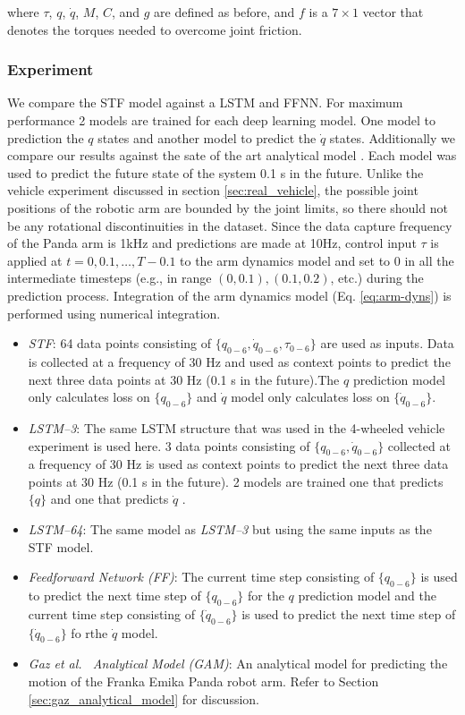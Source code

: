 \documentclass[letterpaper, 10 pt, conference]{ieeeconf}  %
\begin{document}
\noindent where $\tau$, $q$, $\dot{q}$, $M$, $C$, and $g$ are defined as before, and $f$ is a $7\times1$ vector that denotes the torques needed to overcome joint friction.

\subsubsection{Experiment}
We compare the STF model against a LSTM and FFNN. For maximum performance 2 models are trained for each deep learning model. One model to prediction the $q$ states and another model to predict the $\dot q$ states. Additionally we compare our results against the sate of the art analytical model \cite{gaz2019dynamic} . Each model was used to predict the future state of the system 0.1 s in the future. Unlike the vehicle experiment discussed in section \ref{sec:real_vehicle}, the possible joint positions of the robotic arm are bounded by the joint limits, so there should not be any rotational discontinuities in the dataset. Since the data capture frequency of the Panda arm is 1kHz and predictions are made at 10Hz, control input $\tau$ is applied at $t=0, 0.1, \ldots, T-0.1$ to the arm dynamics model and set to $0$ in all the intermediate timesteps (e.g., in range $(0, 0.1), (0.1, 0.2)$, etc.) during the prediction process. Integration of the arm dynamics model (Eq. \ref{eq:arm-dyns}) is performed using numerical integration. 
\begin{itemize}
    \item \emph{STF}: 64 data points consisting of $\{q_{0-6}, \dot q_{0-6}, \tau_{0-6}\}$ are used as inputs.  Data is collected at a frequency of 30 Hz and used as context points to predict the next three data points at 30 Hz (0.1 s in the future).The $q$ prediction model only calculates loss on $\{q_{0-6}\}$ and  $\dot q$ model only calculates loss on $\{\dot q_{0-6}\}$.
    \item \emph{LSTM--3}: The same LSTM structure that was used in the 4-wheeled vehicle experiment is used here. 3 data points consisting of $\{q_{0-6}, \dot q_{0-6}\}$ collected at a frequency of 30 Hz is used as context points to predict the next three data points at 30 Hz (0.1 s in the future). 2 models are trained one that predicts $\{q\}$ and one that predicts  $\dot q$ .
    \item \emph{LSTM--64}: The same model as \emph{LSTM--3} but using the same inputs as the STF model.
    \item \emph{Feedforward Network (FF)}:  The current time step consisting of $\{q_{0-6}\}$ is used to predict the next time step of $\{q_{0-6}\}$ for the $q$ prediction model and the current time step consisting of $\{\dot q_{0-6}\}$ is used to predict the next time step of $\{\dot q_{0-6}\}$ fo rthe $\dot{q}$ model.
    \item \emph{Gaz et al.\ \cite{gaz2019dynamic} Analytical Model (GAM)}: An analytical model for predicting the motion of the Franka Emika Panda robot arm. Refer to Section \ref{sec:gaz_analytical_model} for discussion.
\end{itemize}
\end{document}
